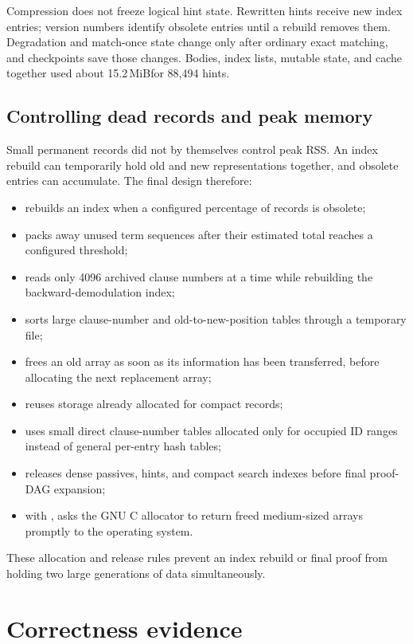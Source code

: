 \documentclass[11pt]{article}
\newcommand{\setting}[1]{\texttt{\detokenize{#1}}}
\newcommand{\mib}{\,MiB}
\begin{document}
Compression does not freeze logical hint state.  Rewritten hints receive new
index entries; version numbers identify obsolete entries until a rebuild removes
them.  Degradation and match-once state change only after ordinary exact
matching, and checkpoints save those changes.  Bodies, index lists, mutable
state, and cache together used about 15.2\mib for 88,494 hints.

\subsection{Controlling dead records and peak memory}

Small permanent records did not by themselves control peak RSS.  An index
rebuild can temporarily hold old and new representations together, and obsolete
entries can accumulate.  The final design therefore:
\begin{itemize}
  \item rebuilds an index when a configured percentage of records is obsolete;
  \item packs away unused term sequences after their estimated total reaches a
        configured threshold;
  \item reads only 4096 archived clause numbers at a time while rebuilding the
        backward-demodulation index;
  \item sorts large clause-number and old-to-new-position tables through a
        temporary file;
  \item frees an old array as soon as its information has been transferred,
        before allocating the next replacement array;
  \item reuses storage already allocated for compact records;
  \item uses small direct clause-number tables allocated only for occupied ID
        ranges instead of general per-entry hash tables;
  \item releases dense passives, hints, and compact search indexes before final
        proof-DAG expansion;
  \item with \setting{P9_COMPACT_HEAP=1}, asks the GNU C allocator to return
        freed medium-sized arrays promptly to the operating system.
\end{itemize}

These allocation and release rules prevent an index rebuild or final proof from
holding two large generations of data simultaneously.

\section{Correctness evidence}
\end{document}
